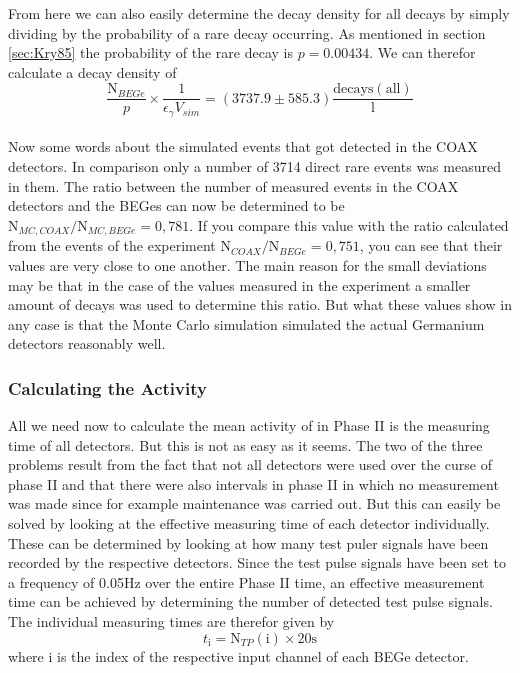 From here we can also easily determine the decay density for all  decays by simply dividing by the probability of a rare decay occurring.
As mentioned in section \ref{sec:Kry85} the probability of the rare decay is $p = 0.00434$.
We can therefor calculate a decay density of 
\begin{equation*}
\frac{\mathrm{N}_{BEGe}}{p}\times\frac{1}{\epsilon_\gamma V_{sim}} =  (3737.9\pm585.3)\frac{\mathrm{decays(all)}}{\mathrm{l}} 
\end{equation*}
\\


Now some words about the simulated events that got detected in the COAX detectors.
In comparison only a number of 3714 direct rare  events was measured in them.
The ratio between the number of measured events in the COAX detectors and the BEGes can now be determined to be \(\mathrm{N}_{MC,COAX}/\mathrm{N}_{MC,BEGe} = 0,781\).
If you compare this value with the ratio calculated from the events of the experiment \(\mathrm{N}_{COAX}/\mathrm{N}_{BEGe} = 0,751\), you can see that their values are very close to one another.
The main reason for the small deviations may be that in the case of the values measured in the experiment a smaller amount of decays was used to determine this ratio. 
But what these values show in any case is that the Monte Carlo simulation simulated the actual Germanium detectors reasonably well.
\\

\subsubsection{Calculating the Activity}

All we need now to calculate the mean activity of  in Phase II is the measuring time of all detectors.
But this is not as easy as it seems.
The two of the three problems result from the fact that not all detectors were used over the curse of phase II and that there were also intervals in phase II in which no measurement was made since for example maintenance was carried out.
But this can easily be solved by looking at the effective measuring time of each detector individually.
These can be determined by looking at how many test puler signals have been recorded by the respective detectors. 
Since the test pulse signals have been set to a frequency of 0.05Hz over the entire Phase II time, an effective measurement time can be achieved by determining the number of detected test pulse signals.
The individual measuring times are therefor given by
\begin{equation*}
    t_\mathrm{i} = \mathrm{N}_{TP}(\mathrm{i}) \times 20\mathrm{s}
\end{equation*}
where i is the index of the respective input channel of each BEGe detector.
\\


